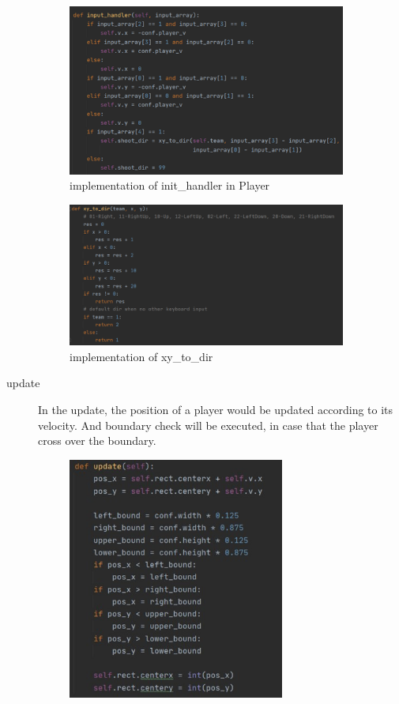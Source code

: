 \documentclass[14pt]{extarticle}
\begin{document}
\begin{description}
\begin{figure}[H]
\begin{center}
			\includegraphics[width=0.9\textwidth]{Player_input}
			\caption{implementation of init\_handler in Player}
		\end{center}
	\end{figure}
	\begin{figure}[H]
	\begin{center}
			\includegraphics[width=0.9\textwidth]{xy_to_dir}
			\caption{implementation of xy\_to\_dir}
		\end{center}
	\end{figure}
	\item[update]
	In the update, the position of a player would be updated according to its velocity. And boundary check will be executed, in case that the player cross over the boundary. 
	\begin{figure}[H]
		\begin{center}
			\includegraphics[width=0.7\textwidth]{Player_update}

\end{center}
\end{figure}
\end{description}
\end{document}
